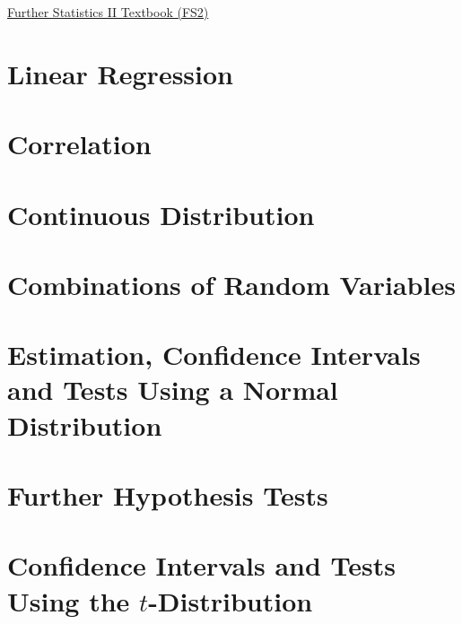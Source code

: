 \href{https://drive.google.com/drive/folders/15jKq0jd-87l-vm9anlj5tpmQ6VRDbtiN}{\hypertarget{book:FS2}{Further Statistics II Textbook (FS2)}}

\section{Linear Regression} \label{}
\newpage
\section{Correlation} \label{}
\newpage
\section{Continuous Distribution} \label{}
\newpage
\section{Combinations of Random Variables} \label{}
\newpage
\section{Estimation, Confidence Intervals and Tests Using a Normal Distribution} \label{}
\newpage
\section{Further Hypothesis Tests} \label{}
\newpage
\section{Confidence Intervals and Tests Using the \texorpdfstring{$t$}{\textit{t}}-Distribution} \label{}
\newpage